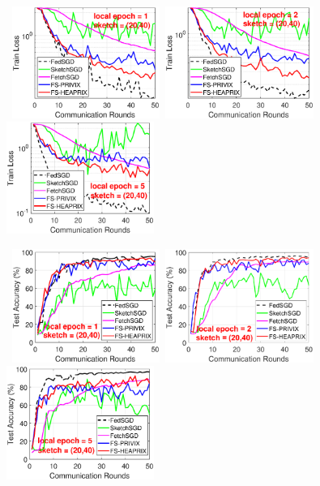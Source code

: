 \documentclass[sigconf, anonymous, review]{acmart}
\begin{document}
\begin{figure}[h]
	\begin{center}
		\mbox{%
		\includegraphics[width=1.9in]{MNIST_figures/local1_sketch20_iid0_train_loss.eps}%
		\includegraphics[width=1.9in]{MNIST_figures/local2_sketch20_iid0_train_loss.eps}%
		\includegraphics[width=1.9in]{MNIST_figures/local5_sketch20_iid0_train_loss.eps} }
		
		\mbox{%
		\includegraphics[width=1.9in]{MNIST_figures/local1_sketch20_iid0_test_acc.eps} %
		\includegraphics[width=1.9in]{MNIST_figures/local2_sketch20_iid0_test_acc.eps} %
		\includegraphics[width=1.9in]{MNIST_figures/local5_sketch20_iid0_test_acc.eps}
		}
		

\end{center}
\end{figure}
\end{document}
